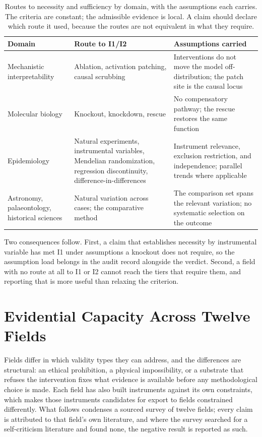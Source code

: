 \documentclass{article}
\begin{document}
\begin{table}[H]
\centering
\caption{Routes to necessity and sufficiency by domain, with the assumptions each carries. The criteria are constant; the admissible evidence is local. A claim should declare which route it used, because the routes are not equivalent in what they require.}
\label{tab:domain-routes}
\small
\begin{tabular}{lp{4.6cm}p{4.6cm}}
\toprule
Domain & Route to I1/I2 & Assumptions carried \\
\midrule
Mechanistic interpretability &
Ablation, activation patching, causal scrubbing &
Interventions do not move the model off-distribution; the patch site is the causal locus \\
\midrule
Molecular biology &
Knockout, knockdown, rescue &
No compensatory pathway; the rescue restores the same function \\
\midrule
Epidemiology &
Natural experiments, instrumental variables, Mendelian randomization, regression discontinuity, difference-in-differences &
Instrument relevance, exclusion restriction, and independence; parallel trends where applicable \\
\midrule
Astronomy, palaeontology, historical sciences &
Natural variation across cases; the comparative method &
The comparison set spans the relevant variation; no systematic selection on the outcome \\
\bottomrule
\end{tabular}
\end{table}

Two consequences follow. First, a claim that establishes necessity by
instrumental variable has met I1 under assumptions a knockout does not require,
so the assumption load belongs in the audit record alongside the verdict.
Second, a field with no route at all to I1 or I2 cannot reach the tiers that
require them, and reporting that is more useful than relaxing the criterion.

\clearpage
\section{Evidential Capacity Across Twelve Fields}
\label{app:field-capacity}

Fields differ in which validity types they can address, and the differences are structural: an ethical prohibition, a physical impossibility, or a substrate that refuses the intervention fixes what evidence is available before any methodological choice is made. Each field has also built instruments against its own constraints, which makes those instruments candidates for export to fields constrained differently. What follows condenses a sourced survey of twelve fields; every claim is attributed to that field's own literature, and where the survey searched for a self-criticism literature and found none, the negative result is reported as such.
\end{document}
